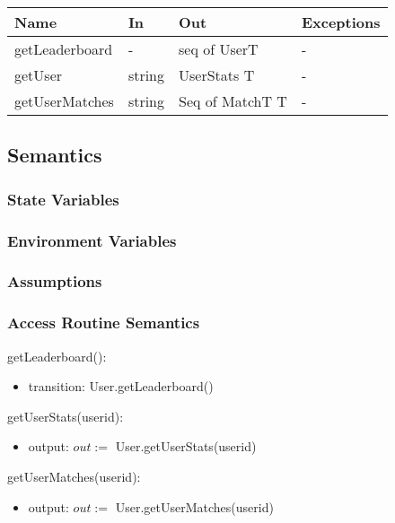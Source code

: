 \documentclass[12pt, titlepage]{article}
\begin{document}
\begin{center}
\begin{tabular}{|p{4cm} |p{4cm} |p{4cm} |p{3cm}|}
\hline
\textbf{Name} & \textbf{In} & \textbf{Out} & \textbf{Exceptions} \\
\hline
 getLeaderboard & - & seq of UserT & - \\
 getUser & string & UserStats T& - \\
 getUserMatches & string &  Seq of MatchT T& - \\
\hline
\end{tabular}
\end{center}

\subsection{Semantics}

\subsubsection{State Variables}

\subsubsection{Environment Variables}

\subsubsection{Assumptions}

\subsubsection{Access Routine Semantics}

\noindent getLeaderboard():
\begin{itemize}
\item transition: User.getLeaderboard()
\end{itemize}

\noindent getUserStats(userid):
\begin{itemize}
\item output: $out :=$ User.getUserStats(userid)
\end{itemize}

\noindent getUserMatches(userid):
\begin{itemize}
\item output: $out :=$ User.getUserMatches(userid)
\end{itemize}
\end{document}
